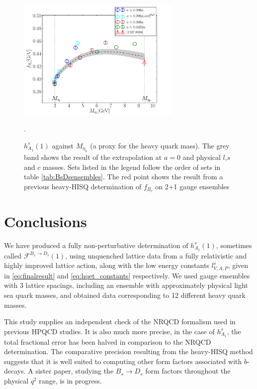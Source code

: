 \begin{figure}[htb!]
  \begin{center}
  \hspace{-20pt}
  \includegraphics[width=0.70\textwidth]{images/BsDsstar/fHcvsmh.pdf}
  \caption{ $h_{A_1}^s(1)$ against $M_{\eta_h}$ (a proxy for the heavy quark mass). The grey band shows the result of the extrapolation at $a=0$ and physical $l$,$s$ and $c$ masses. Sets listed in the legend follow the order of sets in table \ref{tab:BsDsensembles}. The red point shows the result from a previous heavy-HISQ determination of $f_{B_c}$ on 2+1 gauge ensembles \cite{McNeile:2012qf}\label{fig:fHc_vsmh}}.
  \end{center}
\end{figure}

\section{Conclusions}
\label{sec:conclusions}

We have produced a fully non-perturbative determination of $h_{A_1}^s(1)$, sometimes called $\mathcal{F}^{B_s\to D_s}(1)$, using unquenched lattice data from a fully relativistic and highly improved lattice action, along with the low energy constants $l_{V,A,P}^s$, given in \eqref{eq:finalresult} and \eqref{eq:hqet_constants} respectively. We used gauge ensembles with 3 lattice spacings, including an ensemble with approximately physical light sea quark masses, and obtained data corresponding to 12 different heavy quark masses.

This study supplies an independent check of the NRQCD formalism used in previous HPQCD studies. It is also much more precise, in the case of $h_{A_1}^s$, the total fractional error has been halved in comparison to the NRQCD determination. The comparative precision resulting from the heavy-HISQ method suggests that it is well suited to computing other form factors associated with $b$-decays. A sister paper, studying the $B_s\to D_s$ form factors throughout the physical $q^2$ range, is in progress.

